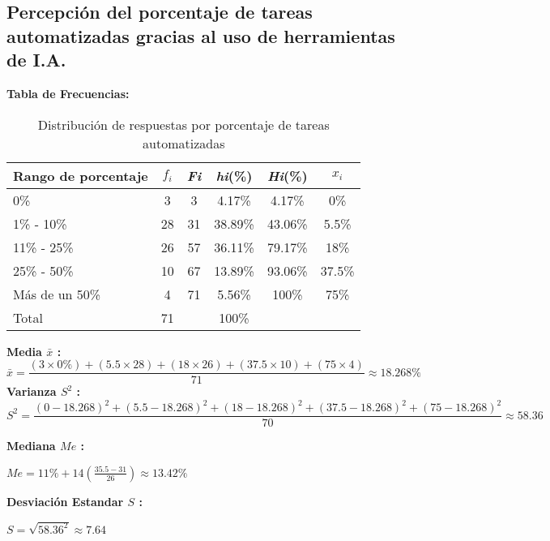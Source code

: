 \subsection{Percepción del porcentaje de tareas automatizadas gracias al uso de herramientas de I.A.}
\vspace{-0.5cm}
\textbf{Tabla de Frecuencias:}

\begin{table}[h!]
	\centering
	\renewcommand{\arraystretch}{1.2}
	\begin{tabular}{l c c c c c}
		\hline
		{Rango de porcentaje} & {\(f_i\)} & \textit{Fi} & \textit{hi}(\%) & \textit{Hi}(\%) & \(x_i\)\\
		\hline
		0\%                  & 3  & 3  & 4.17\%  & 4.17\% & 0\% \\
		1\% - 10\%           & 28 & 31 & 38.89\% & 43.06\% & 5.5\% \\
		11\% - 25\%          & 26 & 57 & 36.11\% & 79.17\% & 18\% \\
		25\% - 50\%          & 10 & 67 & 13.89\% & 93.06\% &37.5\% \\
		Más de un 50\%       & 4  & 71 & 5.56\%  & 100\% & 75\% \\
		\hline
		Total                & 71 &    & 100\%   & & \\
		\hline
	\end{tabular}
	\caption{Distribución de respuestas por porcentaje de tareas automatizadas}
	\label{tabla:porcentaje_IA}
\end{table}
\vspace{-0.5cm}
\textbf{Media $\bar{x}$ :}
\begin{equation*}
	\bar{x} = \frac{(3 \times 0\%) + (5.5 \times 28) + (18 \times 26) + (37.5 \times 10) + (75 \times 4)}{71} \approx 18.268\%
\end{equation*}
\textbf{Varianza $S^2$ :}
\begin{equation*}
	S^2 = \frac{(0-18.268)^2 + (5.5-18.268)^2 + (18-18.268)^2 + (37.5 - 18.268)^2 + (75 - 18.268)^2}{70} \approx 58.36
\end{equation*}
\begin{multicols}{2}
	\textbf{Mediana $Me$ :}
	\vspace{-0.5cm}
	\begin{center}
		$Me = 11\% + 14(\frac{35.5 - 31}{26}) \approx 13.42\%$
	\end{center}
	\textbf{Desviación Estandar $S$ :}
	\vspace{-0.5cm}
	\begin{center}
		$S = \sqrt{58.36^2} \approx 7.64$
	\end{center}
\end{multicols}
